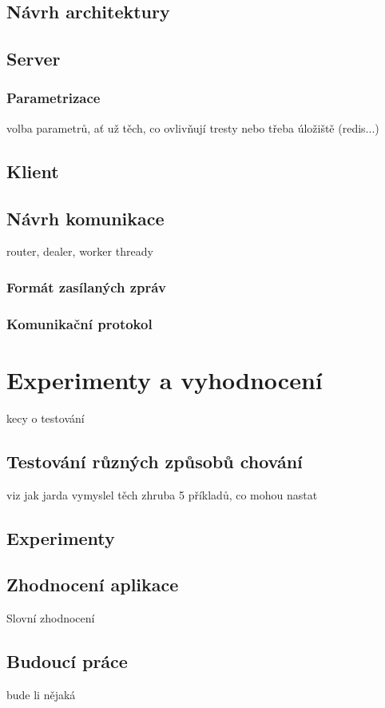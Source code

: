 \documentclass[thesis=M,czech]{FITthesis}[2014/05/07]
\begin{document}
\section{Návrh architektury}

\section{Server}

\subsection{Parametrizace}
volba parametrů, ať už těch, co ovlivňují tresty nebo třeba úložiště (redis...)

\section{Klient}

\section{Návrh komunikace}
router, dealer, worker thready

\subsection{Formát zasílaných zpráv}
\subsection{Komunikační protokol}

\chapter{Experimenty a vyhodnocení}
\label{chap:tests}
kecy o testování
\section{Testování různých způsobů chování}
viz jak jarda vymyslel těch zhruba 5 příkladů, co mohou nastat
\section{Experimenty}

\section{Zhodnocení aplikace}
Slovní zhodnocení
\section{Budoucí práce}
bude li nějaká
\end{document}
